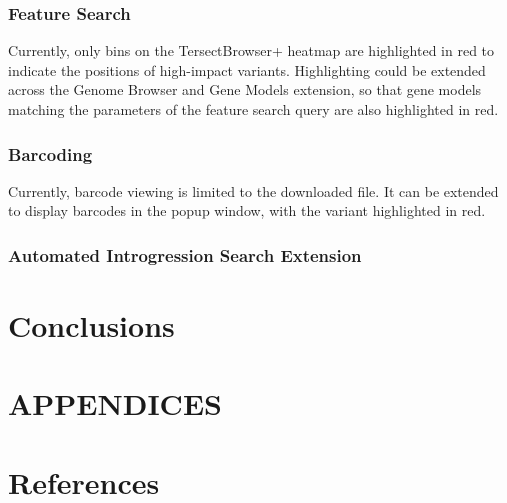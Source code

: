 \documentclass[12pt]{article}
\begin{document}
\subsubsection{Feature Search}
Currently, only bins on the TersectBrowser+ heatmap are highlighted in red to indicate the positions of high-impact variants. Highlighting could be extended across the Genome Browser and Gene Models extension, so that gene models matching the parameters of the feature search query are also highlighted in red.

\subsubsection{Barcoding}
Currently, barcode viewing is limited to the downloaded file. It can be extended to display barcodes in the popup window, with the variant highlighted in red.

\subsubsection{Automated Introgression Search Extension}

\section{Conclusions}



\section{APPENDICES}

\section {References}
\end{document}
